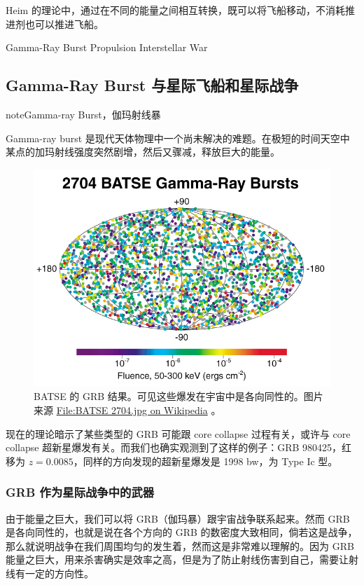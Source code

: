 \documentclass[letterpaper,10pt,english]{sphinxmanual}
\begin{document}
Heim 的理论中，通过在不同的能量之间相互转换，既可以将飞船移动，不消耗推进剂也可以推进飞船。

Gamma-Ray Burst Propulsion
Interstellar War


\subsection{Gamma-Ray Burst 与星际飞船和星际战争}
\label{physics:gamma-ray-burst}
\begin{notice}{note}{Gamma-ray Burst，伽玛射线暴}

Gamma-ray burst 是现代天体物理中一个尚未解决的难题。在极短的时间天空中某点的加玛射线强度突然剧增，然后又骤减，释放巨大的能量。
\begin{figure}[htbp]
\centering
\capstart

\includegraphics{GRB-BATSE-2704.jpg}
\caption{BATSE 的 GRB 结果。可见这些爆发在宇宙中是各向同性的。图片来源 \href{https://commons.wikimedia.org/wiki/File:BATSE\_2704.jpg}{File:BATSE 2704.jpg on Wikipedia} 。}\end{figure}

现在的理论暗示了某些类型的 GRB 可能跟 core collapse 过程有关，或许与 core collapse 超新星爆发有关。而我们也确实观测到了这样的例子：GRB 980425，红移为 $z = 0.0085$，同样的方向发现的超新星爆发是 1998 bw，为 Type Ic 型。
\end{notice}


\subsubsection{GRB 作为星际战争中的武器}
\label{physics:grb}
由于能量之巨大，我们可以将 GRB（伽玛暴）跟宇宙战争联系起来。然而 GRB 是各向同性的，也就是说在各个方向的 GRB 的数密度大致相同，倘若这是战争，那么就说明战争在我们周围均匀的发生着，然而这是非常难以理解的。因为 GRB 能量之巨大，用来杀害确实是效率之高，但是为了防止射线伤害到自己，需要让射线有一定的方向性。
\end{document}
